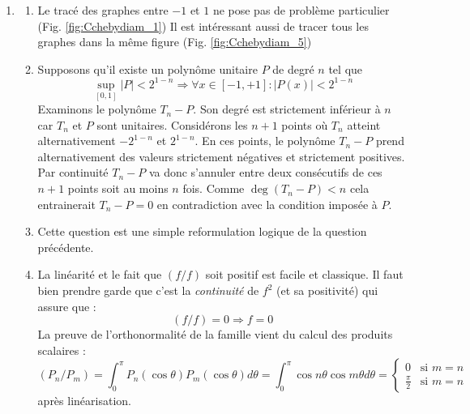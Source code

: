 \begin{enumerate}
\item
\begin{enumerate}
 \item 
 Le tracé des graphes entre $-1$ et $1$ ne pose pas de problème particulier (Fig. \ref{fig:Cchebydiam_1})
Il est intéressant aussi de tracer tous les graphes dans la même figure (Fig. \ref{fig:Cchebydiam_5})
\item Supposons qu'il existe un polynôme unitaire $P$ de degré $n$ tel que
\begin{displaymath}
 \sup_{[0,1]} |P| < 2^{1-n} \Rightarrow \forall x \in [-1, +1] : |P(x)|< 2^{1-n}
\end{displaymath}
Examinons le polynôme $T_n - P$.\newline
Son degré est strictement inférieur à $n$ car $T_n$ et $P$ sont unitaires.\newline
Considérons les $n+1$ points où $T_n$ atteint alternativement $-2^{1-n}$ et $2^{1-n}$. En ces points, le polynôme $T_n -P$ prend alternativement des valeurs strictement négatives et strictement positives. Par continuité $T_n -P$ va donc s'annuler entre deux consécutifs de ces $n+1$ points soit au moins $n$ fois. Comme $\deg (T_n -P) <n$ cela entrainerait $T_n -P=0$ en contradiction avec la condition imposée à $P$.
\item Cette question est une simple reformulation logique de la question précédente.
\item La linéarité et le fait que $(f/f)$ soit positif est facile et classique. Il faut bien prendre garde que c'est la \emph{continuité} de $f^2$ (et sa positivité) qui assure que :
\begin{displaymath}
 (f/f)=0 \Rightarrow f=0
\end{displaymath}
La preuve de l'orthonormalité de la famille vient du calcul des produits scalaires :
\begin{displaymath}
 (P_n/P_m)=\int_0^\pi P_n(\cos\theta) P_m(\cos\theta) d\theta 
 = \int_0^\pi \cos n \theta \cos m\theta  d\theta 
 =  \begin{cases}
     0& \text{si $m=n$}\\ 
     \frac{\pi}{2}& \text{si $m=n$}
    \end{cases}
\end{displaymath}
après linéarisation.
\end{enumerate}
\end{enumerate}

